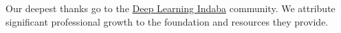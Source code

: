 

{Our deepest thanks go to the \href{https://deeplearningindaba.com/2025/}{Deep Learning Indaba} community. We attribute significant professional growth to the foundation and resources they provide.

}

